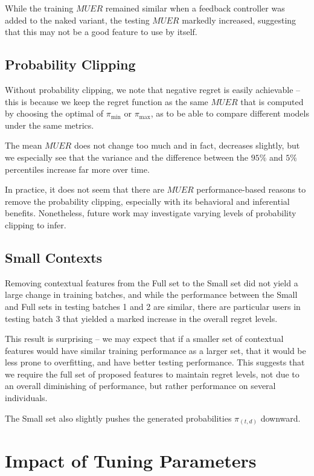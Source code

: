 While the training $MUER$ remained similar when a feedback controller was added to the naked variant, the testing $MUER$ markedly increased, suggesting that this may not be a good feature to use by itself.

\subsection{Probability Clipping}

Without probability clipping, we note that negative regret is easily achievable -- this is because we keep the regret function as the same $MUER$ that is computed by choosing the optimal of $\pi_\text{min}$ or $\pi_\text{max}$, as to be able to compare different models under the same metrics.

The mean $MUER$ does not change too much and in fact, decreases slightly, but we especially see that the variance and the difference between the $95\%$ and $5\%$ percentiles increase far more over time. 

In practice, it does not seem that there are $MUER$ performance-based reasons to remove the probability clipping, especially with its behavioral and inferential benefits.  Nonetheless, future work may investigate varying levels of probability clipping to infer.

\subsection{Small Contexts}

Removing contextual features from the Full set to the Small set did not yield a large change in training batches, and while the performance between the Small and Full sets in testing batches 1 and 2 are similar, there are particular users in testing batch 3 that yielded a marked increase in the overall regret levels.

This result is surprising -- we may expect that if a smaller set of contextual features would have similar training performance as a larger set, that it would be less prone to overfitting, and have better testing performance.  This suggests that we require the full set of proposed features to maintain regret levels, not due to an overall diminishing of performance, but rather performance on several individuals.

The Small set also slightly pushes the generated probabilities $\pi_{(t,d)}$ downward.



\section{Impact of Tuning Parameters}

